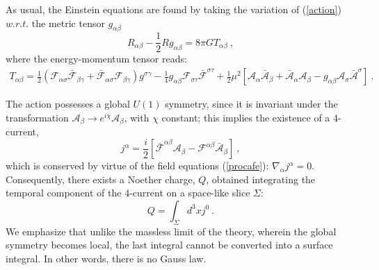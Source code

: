 As usual, the Einstein equations are found by taking the variation of
(\ref{action}) $w.r.t.$ the metric tensor $g_{\alpha \beta}$
\begin{equation}
R_{\alpha \beta}-\frac{1}{2}R g_{\alpha \beta}=8 \pi G T_{\alpha \beta} \ ,
\label{Einstein-eqs}
\end{equation}
where the energy-momentum tensor reads:
\begin{eqnarray}
T_{\alpha\beta}=\frac{1}{2}
( \mathcal{F}_{\alpha \sigma }\bar{\mathcal{F}}_{\beta \gamma}
+\bar{\mathcal{F}}_{\alpha \sigma } \mathcal{F}_{\beta \gamma}
)g^{\sigma \gamma}
-\frac{1}{4}g_{\alpha\beta}\mathcal{F}_{\sigma\tau}\bar{\mathcal{F}}^{\sigma\tau}+\frac{1}{2}\mu^2\left[  
\mathcal{A}_{\alpha}\bar{\mathcal{A}}_{\beta}
+\bar{\mathcal{A}}_{\alpha}\mathcal{A}_{\beta}
-g_{\alpha\beta} \mathcal{A}_\sigma\bar{\mathcal{A}}^\sigma\right]\ . \ \ \ \ \ \ \  \ 
\label{procaemt}
\end{eqnarray}

The action possesses a global $U(1)$ symmetry, since it is invariant under the transformation 
$\mathcal{A}_\beta\rightarrow e^{i\chi}\mathcal{A}_\beta$, with $\chi$ constant; 
this implies the existence of a  4-current, 
%
\begin{equation}
\label{j}
j^\alpha=\frac{i}{2}\left[\bar{\mathcal{F}}^{\alpha \beta}\mathcal{A}_\beta-\mathcal{F}^{\alpha\beta}\bar{\mathcal{A}}_\beta\right] \ ,
\end{equation}
which is conserved by virtue of the field equations (\ref{procafe}): $\nabla_\alpha j^\alpha=0$. Consequently, there exists a Noether charge, $Q$, obtained integrating the temporal component of the 4-current on a space-like slice $\Sigma$:
\begin{equation}
Q=\int_\Sigma d^3x j^0 \ .
\label{q}
\end{equation}
We emphasize that unlike the massless limit of the theory, wherein the global symmetry becomes local, the last integral cannot be converted into a surface integral. In other words, there is no Gauss law.


 
